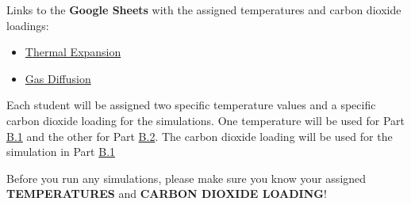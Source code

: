 \documentclass[
  letterpaper,
]{article}
\providecommand{\tightlist}{%
  \setlength{\itemsep}{0pt}\setlength{\parskip}{0pt}}\usepackage{longtable,booktabs,array}
\begin{document}
\begin{tcolorbox}[enhanced jigsaw, toptitle=1mm, opacitybacktitle=0.6, colframe=quarto-callout-warning-color-frame, toprule=.15mm, breakable, bottomrule=.15mm, left=2mm, title=\textcolor{quarto-callout-warning-color}{\faExclamationTriangle}\hspace{0.5em}{Warning}, titlerule=0mm, leftrule=.75mm, bottomtitle=1mm, coltitle=black, arc=.35mm, rightrule=.15mm, opacityback=0, colback=white, colbacktitle=quarto-callout-warning-color!10!white]

Links to the \textbf{Google Sheets} with the assigned temperatures and
carbon dioxide loadings:

\begin{itemize}
\tightlist
\item
  \href{https://docs.google.com/spreadsheets/d/1uy_fF13Oas9IhqCImCSvfEXV6vRb6oteAZK-Uj8DyMA/edit?usp=sharing}{Thermal
  Expansion}
\item
  \href{https://docs.google.com/spreadsheets/d/1zJnp6O_ToFMoJD91_3kiozHoKz9uGf1wEIlJoa3D_U8/edit?usp=sharing}{Gas
  Diffusion}
\end{itemize}

\end{tcolorbox}

Each student will be assigned two specific temperature values and a
specific carbon dioxide loading for the simulations. One temperature
will be used for Part
\protect\hyperlink{part-b.1-gas-simulation-in-zif-8}{B.1} and the other
for Part \protect\hyperlink{part-b.2-thermal-expansion-of-zif-8}{B.2}.
The carbon dioxide loading will be used for the simulation in Part
\protect\hyperlink{part-b.1-gas-simulation-in-zif-8}{B.1}

\begin{tcolorbox}[enhanced jigsaw, toptitle=1mm, opacitybacktitle=0.6, colframe=quarto-callout-important-color-frame, toprule=.15mm, breakable, bottomrule=.15mm, left=2mm, title=\textcolor{quarto-callout-important-color}{\faExclamation}\hspace{0.5em}{Important}, titlerule=0mm, leftrule=.75mm, bottomtitle=1mm, coltitle=black, arc=.35mm, rightrule=.15mm, opacityback=0, colback=white, colbacktitle=quarto-callout-important-color!10!white]

Before you run any simulations, please make sure you know your assigned
\textbf{TEMPERATURES} and \textbf{CARBON DIOXIDE LOADING}!

\end{tcolorbox}
\end{document}
